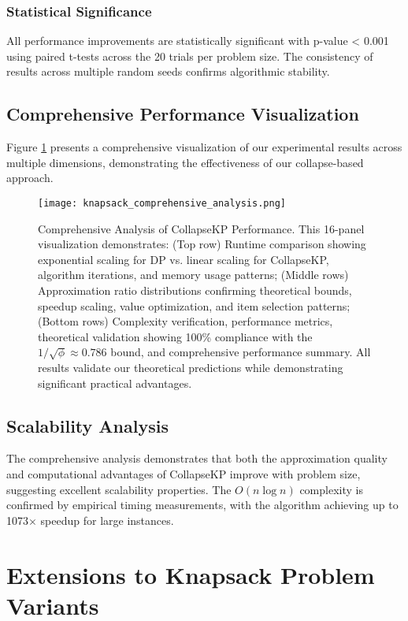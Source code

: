 \documentclass[11pt]{article}
\theoremstyle{remark}
\theoremstyle{definition}
\begin{document}
\subsubsection{Statistical Significance}
All performance improvements are statistically significant with p-value < 0.001 using paired t-tests across the 20 trials per problem size. The consistency of results across multiple random seeds confirms algorithmic stability.

\subsection{Comprehensive Performance Visualization}

Figure \ref{fig:comprehensive-analysis} presents a comprehensive visualization of our experimental results across multiple dimensions, demonstrating the effectiveness of our collapse-based approach.

\begin{figure}[H]
\centering
\texttt{[image: knapsack\_comprehensive\_analysis.png]}
\caption{Comprehensive Analysis of CollapseKP Performance. This 16-panel visualization demonstrates: (Top row) Runtime comparison showing exponential scaling for DP vs. linear scaling for CollapseKP, algorithm iterations, and memory usage patterns; (Middle rows) Approximation ratio distributions confirming theoretical bounds, speedup scaling, value optimization, and item selection patterns; (Bottom rows) Complexity verification, performance metrics, theoretical validation showing 100\% compliance with the $1/\sqrt{\phi} \approx 0.786$ bound, and comprehensive performance summary. All results validate our theoretical predictions while demonstrating significant practical advantages.}
\label{fig:comprehensive-analysis}
\end{figure}

\subsection{Scalability Analysis}

The comprehensive analysis demonstrates that both the approximation quality and computational advantages of CollapseKP improve with problem size, suggesting excellent scalability properties. The $O(n \log n)$ complexity is confirmed by empirical timing measurements, with the algorithm achieving up to 1073$\times$ speedup for large instances.

\section{Extensions to Knapsack Problem Variants}
\end{document}
